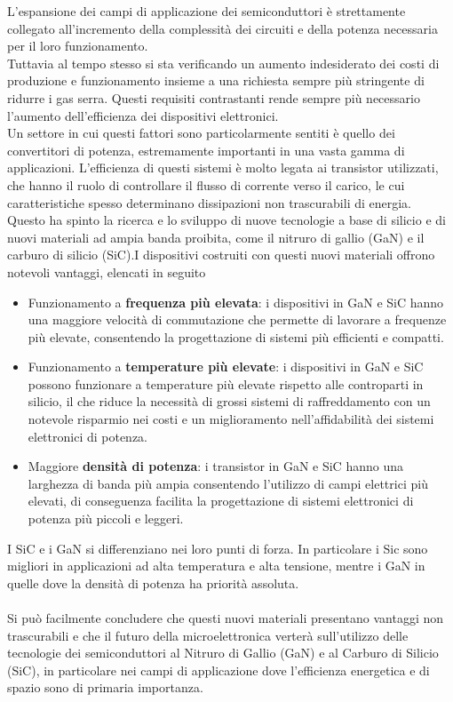 L'espansione dei campi di applicazione dei semiconduttori è strettamente collegato all'incremento della complessità dei circuiti e della potenza necessaria per il loro funzionamento.\\
Tuttavia al tempo stesso si sta verificando un  aumento indesiderato dei costi di produzione e funzionamento insieme a una richiesta sempre più stringente di ridurre i gas serra. Questi requisiti contrastanti rende sempre più necessario l'aumento dell'efficienza dei dispositivi elettronici.\\
Un settore in cui questi fattori sono particolarmente sentiti è quello dei convertitori di potenza, estremamente importanti in una vasta gamma di applicazioni. L'efficienza di questi sistemi è molto legata ai transistor utilizzati, che hanno il ruolo di controllare il flusso di corrente verso il carico, le cui caratteristiche spesso determinano dissipazioni non trascurabili di energia.\\Questo ha spinto la ricerca e lo sviluppo di nuove tecnologie a base di silicio e di nuovi materiali ad ampia banda proibita, come il nitruro di gallio (GaN) e il carburo di silicio (SiC).I dispositivi costruiti con questi nuovi materiali offrono notevoli vantaggi, elencati in seguito 
\begin{itemize}
    \item  Funzionamento a \textbf{frequenza più elevata}: i dispositivi in GaN e SiC hanno una maggiore velocità di commutazione che permette di lavorare a frequenze più elevate, consentendo la progettazione di sistemi più efficienti e compatti.
    \item  Funzionamento a \textbf{temperature più elevate}: i dispositivi in GaN e SiC possono funzionare a temperature più elevate rispetto alle controparti in silicio, il che riduce la necessità di grossi sistemi di raffreddamento con un notevole risparmio nei costi e un miglioramento nell'affidabilità dei sistemi elettronici di potenza. 
    \item  Maggiore \textbf{densità di potenza}: i transistor in GaN e SiC hanno una larghezza di banda più ampia consentendo l'utilizzo di campi elettrici più elevati, di conseguenza facilita la progettazione di sistemi elettronici di potenza più piccoli e leggeri.
\end{itemize}
I SiC e i GaN si differenziano nei loro punti di forza. In particolare i Sic sono migliori in applicazioni ad alta temperatura e alta tensione, mentre i GaN in quelle dove la densità di potenza ha priorità assoluta. \\\\ Si può facilmente concludere che questi nuovi materiali presentano vantaggi non trascurabili e che il futuro della microelettronica verterà sull'utilizzo  delle tecnologie dei semiconduttori al Nitruro di Gallio (GaN) e al Carburo di Silicio (SiC), in particolare nei campi di applicazione dove l'efficienza energetica e di spazio sono di primaria importanza.\cite{GaNSiCTexInstru}\cite{InfineonWide}
\printbibliography
